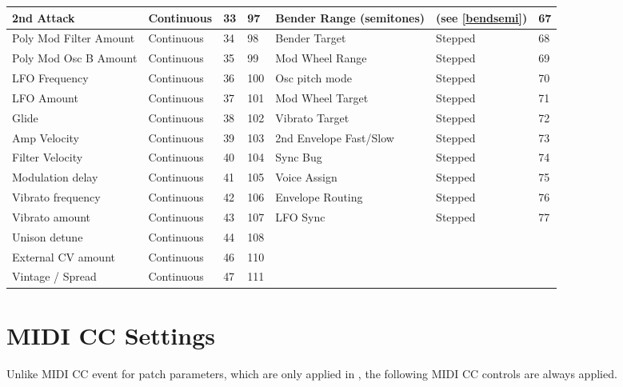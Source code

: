 \begin{longtable}[l]{ p{5cm}|p{2cm}|p{1.5cm}|p{1.5cm}|p{5cm}|p{2cm}|p{1cm}}
2nd Attack  &  Continuous  & 33 & 97 &  Bender Range (semitones)  &  (see \ref{bendsemi})  &  67 \\ \hline
Poly Mod Filter Amount  &  Continuous  & 34 & 98 &  Bender Target  &  Stepped  &  68 \\ \hline
Poly Mod Osc B Amount  &  Continuous  & 35 & 99 &  Mod Wheel Range  &  Stepped  &  69 \\ \hline
LFO Frequency  &  Continuous  & 36 & 100 &  Osc pitch mode  &  Stepped  &  70 \\ \hline
LFO Amount  &  Continuous  & 37 & 101 &  Mod Wheel Target  &  Stepped  &  71 \\ \hline
Glide  &  Continuous  & 38 & 102 &  Vibrato Target  &  Stepped  &  72 \\ \hline
Amp Velocity  &  Continuous  & 39 & 103 &   2nd Envelope Fast/Slow  &  Stepped  &  73 \\ \hline
Filter Velocity  &  Continuous  & 40 & 104 &  Sync Bug  &  Stepped  &  74 \\ \hline
Modulation delay  &  Continuous  & 41 & 105 &  Voice Assign  &  Stepped  &  75 \\ \hline
Vibrato frequency  &  Continuous  & 42 & 106 &  Envelope Routing  &  Stepped  &  76 \\ \hline
Vibrato amount  &  Continuous  & 43 & 107 &  LFO Sync  &  Stepped  &  77 \\ \hline
Unison detune  &  Continuous  & 44 & 108 &    &    &   \\ \hline
External CV amount  &  Continuous  & 46 & 110 &  &  &   \\ \hline 
Vintage / Spread  &  Continuous  & 47 & 111 &  &  &   \\ \hline 
 
\end{longtable}

\normalsize

\section{MIDI CC Settings}

Unlike MIDI CC event for patch parameters, which are only applied in \presetmode, the following MIDI CC controls are always applied. 

\renewcommand{\arraystretch}{1.3}

